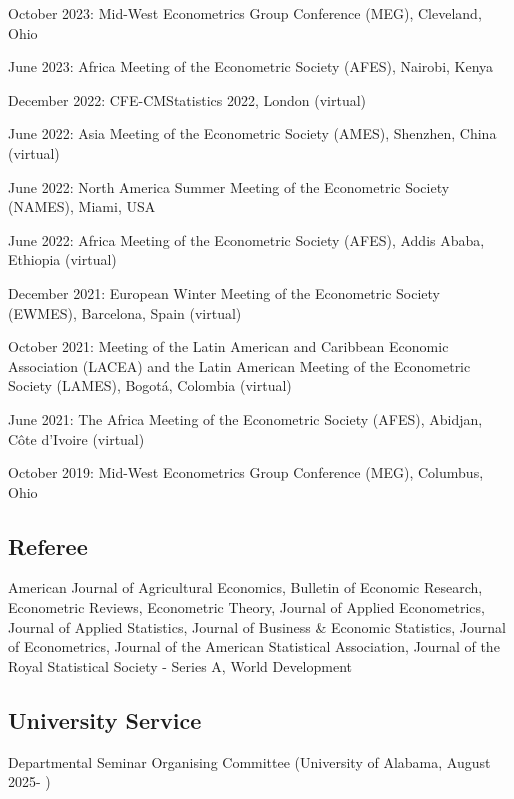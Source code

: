 \documentclass[12pt,letterpaper]{article}
\renewenvironment{itemize}{
  \begin{list}{}{
    \setlength{\leftmargin}{1.5em}
  }
}{
  \end{list}
}
\begin{document}
\begin{itemize}
  \item October 2023: Mid-West Econometrics Group Conference (MEG), Cleveland, Ohio
  \item June 2023: Africa Meeting of the Econometric Society (AFES), Nairobi, Kenya
  \item December 2022: CFE-CMStatistics 2022, London (virtual)
  \item June 2022: Asia Meeting of the Econometric Society (AMES), Shenzhen, China (virtual)
  \item June 2022: North America Summer Meeting of the Econometric Society (NAMES), Miami, USA
  \item June 2022: Africa Meeting of the Econometric Society (AFES), Addis Ababa, Ethiopia (virtual)
  \item December 2021: European Winter Meeting of the Econometric Society\\ (EWMES), Barcelona, Spain (virtual)
  \item October 2021: Meeting of the Latin American and Caribbean Economic Association (LACEA) and the Latin American Meeting of the Econometric Society (LAMES), Bogotá, Colombia (virtual)
	\item June 2021: The Africa Meeting of the Econometric Society (AFES), Abidjan, C\^ote d'Ivoire (virtual)
	\item October 2019: Mid-West Econometrics Group Conference (MEG), Columbus, Ohio
\end{itemize}

\subsection*{Referee} American Journal of Agricultural Economics, Bulletin of Economic Research, Econometric Reviews, Econometric Theory, Journal of Applied Econometrics, Journal of Applied Statistics, Journal of Business \& Economic Statistics, Journal of Econometrics, Journal of the American Statistical Association, Journal of the Royal Statistical Society - Series A, World Development 

\subsection*{University Service}

\begin{itemize}
	\item Departmental Seminar Organising Committee (University of Alabama, August 2025- )
\end{itemize}
\end{document}

